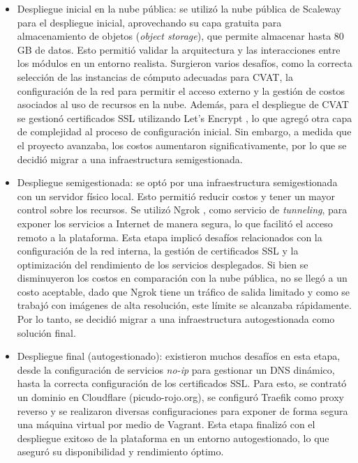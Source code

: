 \begin{itemize}
  \item Despliegue inicial en la nube pública: se utilizó la nube pública de Scaleway para el despliegue inicial, aprovechando su capa gratuita para almacenamiento de objetos (\textit{object storage}), que permite almacenar hasta 80 GB de datos. Esto permitió validar la arquitectura y las interacciones entre los módulos en un entorno realista. Surgieron varios desafíos, como la correcta selección de las instancias de cómputo adecuadas para CVAT, la configuración de la red para permitir el acceso externo y la gestión de costos asociados al uso de recursos en la nube. Además, para el despliegue de CVAT se gestionó certificados SSL utilizando Let's Encrypt \citep{aas_lets_2019}, lo que agregó otra capa de complejidad al proceso de configuración inicial. Sin embargo, a medida que el proyecto avanzaba, los costos aumentaron significativamente, por lo que se decidió migrar a una infraestructura semigestionada.
  \item Despliegue semigestionada: se optó por una infraestructura semigestionada con un servidor físico local. Esto permitió reducir costos y tener un mayor control sobre los recursos. Se utilizó Ngrok \citep{ngrok_inc_ngrok_nodate}, como servicio de \textit{tunneling}, para exponer los servicios a Internet de manera segura, lo que facilitó el acceso remoto a la plataforma. Esta etapa implicó desafíos relacionados con la configuración de la red interna, la gestión de certificados SSL y la optimización del rendimiento de los servicios desplegados. Si bien se disminuyeron los costos en comparación con la nube pública, no se llegó a un costo aceptable, dado que Ngrok tiene un tráfico de salida limitado y como se trabajó con imágenes de alta resolución, este límite se alcanzaba rápidamente. Por lo tanto, se decidió migrar a una infraestructura autogestionada como solución final.
  \item Despliegue final (autogestionado): existieron muchos desafíos en esta etapa, desde la configuración de servicios \textit{no-ip} para gestionar un DNS dinámico, hasta la correcta configuración de los certificados SSL. Para esto, se contrató un dominio en Cloudflare \citep{cloudflare_conecta_nodate} (picudo-rojo.org), se configuró Traefik \citep{traefik_labs_traefik_nodate} como proxy reverso y se realizaron diversas configuraciones para exponer de forma segura una máquina virtual por medio de Vagrant. Esta etapa finalizó con el despliegue exitoso de la plataforma en un entorno autogestionado, lo que aseguró su disponibilidad y rendimiento óptimo.
\end{itemize}

